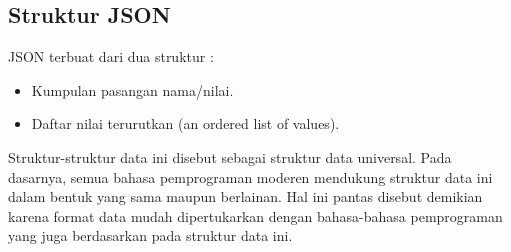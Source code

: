 \subsection{Struktur JSON}
\label{subsec:stukturjson}
JSON terbuat dari dua struktur :
\begin{itemize}
	\item Kumpulan pasangan nama/nilai.
	\item Daftar nilai terurutkan (an ordered list of values).
\end{itemize} 

Struktur-struktur data ini disebut sebagai struktur data universal. Pada dasarnya, semua bahasa pemprograman moderen mendukung struktur data ini dalam bentuk yang sama maupun berlainan. Hal ini pantas disebut demikian karena format data mudah dipertukarkan dengan bahasa-bahasa pemprograman yang juga berdasarkan pada struktur data ini.
 

